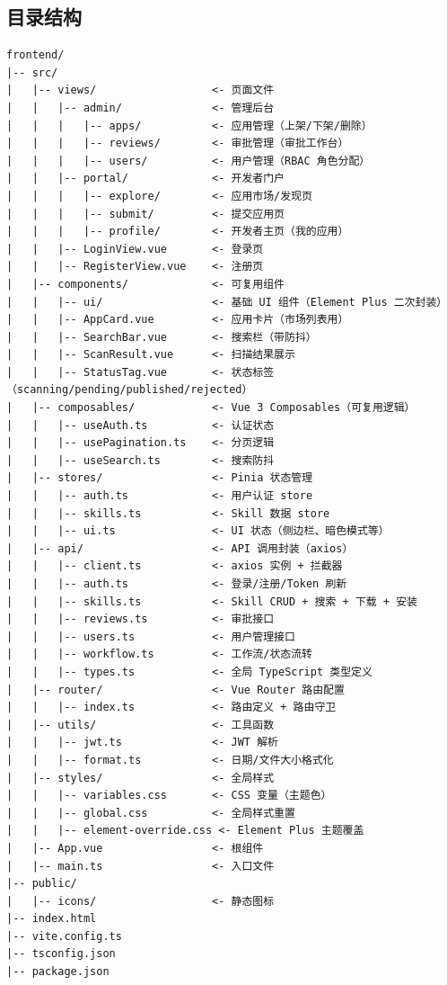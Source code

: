 \documentclass[11pt,a4paper]{article}
\begin{document}
\subsection{目录结构}

\begin{verbatim}
frontend/
|-- src/
|   |-- views/                  <- 页面文件
|   |   |-- admin/              <- 管理后台
|   |   |   |-- apps/           <- 应用管理（上架/下架/删除）
|   |   |   |-- reviews/        <- 审批管理（审批工作台）
|   |   |   |-- users/          <- 用户管理（RBAC 角色分配）
|   |   |-- portal/             <- 开发者门户
|   |   |   |-- explore/        <- 应用市场/发现页
|   |   |   |-- submit/         <- 提交应用页
|   |   |   |-- profile/        <- 开发者主页（我的应用）
|   |   |-- LoginView.vue       <- 登录页
|   |   |-- RegisterView.vue    <- 注册页
|   |-- components/             <- 可复用组件
|   |   |-- ui/                 <- 基础 UI 组件（Element Plus 二次封装）
|   |   |-- AppCard.vue         <- 应用卡片（市场列表用）
|   |   |-- SearchBar.vue       <- 搜索栏（带防抖）
|   |   |-- ScanResult.vue      <- 扫描结果展示
|   |   |-- StatusTag.vue       <- 状态标签（scanning/pending/published/rejected）
|   |-- composables/            <- Vue 3 Composables（可复用逻辑）
|   |   |-- useAuth.ts          <- 认证状态
|   |   |-- usePagination.ts    <- 分页逻辑
|   |   |-- useSearch.ts        <- 搜索防抖
|   |-- stores/                 <- Pinia 状态管理
|   |   |-- auth.ts             <- 用户认证 store
|   |   |-- skills.ts           <- Skill 数据 store
|   |   |-- ui.ts               <- UI 状态（侧边栏、暗色模式等）
|   |-- api/                    <- API 调用封装（axios）
|   |   |-- client.ts           <- axios 实例 + 拦截器
|   |   |-- auth.ts             <- 登录/注册/Token 刷新
|   |   |-- skills.ts           <- Skill CRUD + 搜索 + 下载 + 安装
|   |   |-- reviews.ts          <- 审批接口
|   |   |-- users.ts            <- 用户管理接口
|   |   |-- workflow.ts         <- 工作流/状态流转
|   |   |-- types.ts            <- 全局 TypeScript 类型定义
|   |-- router/                 <- Vue Router 路由配置
|   |   |-- index.ts            <- 路由定义 + 路由守卫
|   |-- utils/                  <- 工具函数
|   |   |-- jwt.ts              <- JWT 解析
|   |   |-- format.ts           <- 日期/文件大小格式化
|   |-- styles/                 <- 全局样式
|   |   |-- variables.css       <- CSS 变量（主题色）
|   |   |-- global.css          <- 全局样式重置
|   |   |-- element-override.css <- Element Plus 主题覆盖
|   |-- App.vue                 <- 根组件
|   |-- main.ts                 <- 入口文件
|-- public/
|   |-- icons/                  <- 静态图标
|-- index.html
|-- vite.config.ts
|-- tsconfig.json
|-- package.json
\end{verbatim}
\end{document}
